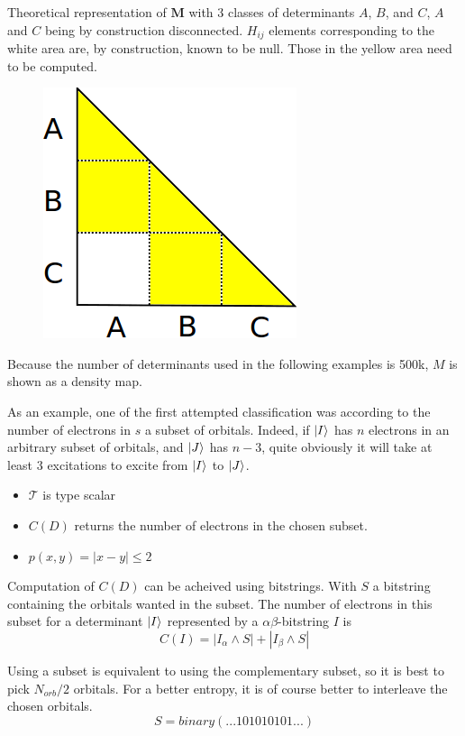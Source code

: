 \documentclass[./thesis.tex]{subfiles}
\begin{document}
\alert{
Theoretical representation of $\mathbf{M}$ with 3 classes of determinants $A$, $B$, and $C$, $A$ and $C$ being by construction disconnected. $H_{ij}$ elements corresponding to the white area are, by construction, known to be null. Those in the yellow area need to be computed.
}
    
\begin{figure}[h!]
	\begin{center}
		\includegraphics[width=0.4\columnwidth]{figures/davidson/disconnected_classes}
		\caption{{\label{generators_selectors}
		}}
	\end{center}
\end{figure}

Because the number of determinants used in the following examples is 500k, $M$ is shown as a density map.

As an example, one of the first attempted classification was according to the number of electrons in $s$ a subset of orbitals. Indeed, if $\ket I$ has $n$ electrons in an arbitrary subset of orbitals, and $\ket J$ has $n-3$, quite obviously it will take at least 3 excitations to excite from $\ket I$ to $\ket J$.
\begin{itemize}
	\item
	$\mathcal{T}$ is type scalar
	\item
	$C(D)$ returns the number of electrons in the chosen subset.
	\item
	$p(x, y) = |x-y| \leq 2$
\end{itemize}

Computation of $C(D)$ can be acheived using bitstrings. With $S$ a bitstring containing the orbitals wanted in the subset. The number of electrons in this subset for a determinant $\ket I$ represented by a $\alpha \beta$-bitstring $I$ is
\begin{equation}
C(I)=|I_{\alpha} \wedge S|+|I_{\beta} \wedge S|
\end{equation}

Using a subset is equivalent to using the complementary subset, so it is best to pick $N_{orb}/2$ orbitals. For a better entropy, it is of course better to interleave the chosen orbitals.
\begin{equation}
S=binary(...101010101...)
\end{equation}
    
\end{document}
